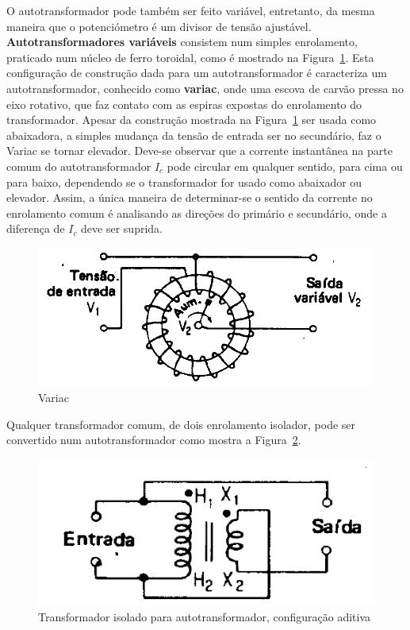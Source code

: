\documentclass[paper=a4, fontsize=11pt]{article}
\begin{document}
O autotransformador pode também ser feito variável, entretanto, da mesma maneira
que o potenciómetro é um divisor de tensão ajustável. 
\textbf{Autotransformadores variáveis} consistem num simples enrolamento, praticado
num núcleo de ferro toroidal, como é mostrado na Figura~\ref{variac}. Esta configuração
de construção dada para um autotransformador é caracteriza um autotransformador, 
conhecido como \textbf{variac}, onde uma escova de carvão pressa no eixo rotativo, que 
faz contato com as espiras expostas do enrolamento do transformador. Apesar da
construção mostrada na Figura~\ref{variac} ser usada como abaixadora, a simples
mudança da tensão de entrada ser no secundário, faz o Variac se tornar elevador.
Deve-se observar que a corrente instantânea na parte comum do autotransformador
$I_c$ pode circular em qualquer sentido, para cima ou para baixo, dependendo se
o transformador for usado como abaixador ou elevador. Assim, a única maneira
de determinar-se o sentido da corrente no enrolamento comum é analisando
as direções do primário e secundário, onde a diferença de  $I_c$ deve ser suprida.


\begin{figure}[!ht]
    \centering
    \includegraphics[scale=.4]{toroidal.png}
    \caption{Variac}
    \label{variac}
\end{figure}

Qualquer transformador comum, de dois enrolamento isolador, pode ser convertido
num autotransformador como mostra a Figura~\ref{isolador}.

\begin{figure}[!ht]
    \centering
    \includegraphics[scale=.4]{isolado.png}
    \caption{Transformador isolado para autotransformador, configuração aditiva}
    \label{isolador}
\end{figure}
\end{document}
